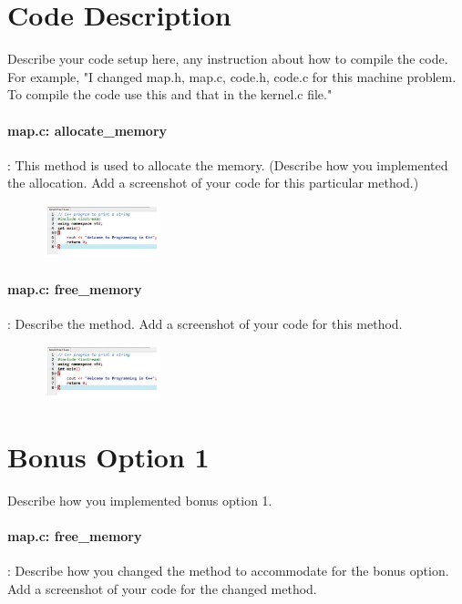 \documentclass{article}
\begin{document}
\newpage
\section*{Code Description}

Describe your code setup here, any instruction about how to compile the code. For example, "I changed map.h, map.c, code.h, code.c for this machine problem. To compile the code use this and that in the kernel.c file."

\paragraph{map.c: allocate\_memory}: This method is used to allocate the memory. (Describe how you implemented the allocation. Add a screenshot of your code for this particular method.)

\begin{figure}[!h]
\centering
\includegraphics[width=0.3\textwidth]{figs/code_screen_shot.jpg}
\end{figure}


\paragraph{map.c: free\_memory}: Describe the method. Add a screenshot of your code for this method.

\begin{figure}[!h]
\centering
\includegraphics[width=0.3\textwidth]{figs/code_screen_shot.jpg}
\end{figure}

\section*{Bonus Option 1}
Describe how you implemented bonus option 1.

\paragraph{map.c: free\_memory}: Describe how you changed the method to accommodate for the bonus option. Add a screenshot of your code for the changed method.
\end{document}
